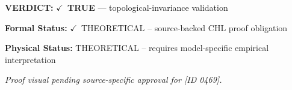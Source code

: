 \textbf{VERDICT:} \ensuremath{\checkmark}\ \textbf{TRUE} --- topological-invariance validation

\textbf{Formal Status:} \ensuremath{\checkmark}\ THEORETICAL -- source-backed CHL proof obligation

\textbf{Physical Status:} THEORETICAL -- requires model-specific empirical interpretation
\par\vspace{0.45em}
\par
\vfill
\begingroup\footnotesize\itshape
Proof visual pending source-specific approval for [ID 0469].
\par\endgroup
\vfill
\endgroup
\endgroup
